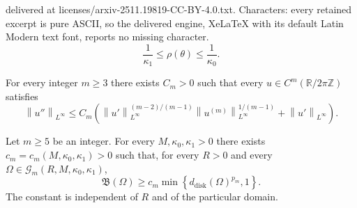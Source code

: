 \documentclass[10pt,a4paper]{amsart}
\newcommand{\R}{\mathbb{R}}
\newcommand{\cG}{\mathcal{G}}
\begin{document}
delivered at licenses/arxiv-2511.19819-CC-BY-4.0.txt. Characters: every retained excerpt is pure ASCII, so the delivered engine, XeLaTeX with its default Latin Modern text font, reports no missing character.
\begin{equation}\label{eq:rho-bounds}
\frac1{\kappa_1}\le\rho(\theta)\le\frac1{\kappa_0}.
\end{equation}

\begin{lemma}\label{lem:periodic-interpolation}
For every integer $m\geq3$ there exists $C_m>0$ such that every
$u\in C^m\left(\R/2\pi\mathbb Z\right)$ satisfies
\begin{equation}\label{eq:periodic-interpolation}
 \left\|u''\right\|_{L^\infty}
 \leq C_m\left(
 \left\|u'\right\|_{L^\infty}^{(m-2)/(m-1)}
 \left\|u^{(m)}\right\|_{L^\infty}^{1/(m-1)}
 +\left\|u'\right\|_{L^\infty}\right).
\end{equation}
\end{lemma}

\begin{proposition}
\label{prop:defect-distance}
Let $m\geq5$ be an integer. For every $M,\kappa_0,\kappa_1>0$ there exists
$c_m=c_m\left(M,\kappa_0,\kappa_1\right)>0$ such that, for every $R>0$ and every
$\Omega\in\cG_m\left(R,M,\kappa_0,\kappa_1\right)$,
\begin{equation}\label{eq:defect-distance-lower}
 \mathfrak B(\Omega)
 \geq c_m
 \min\left\{d_{\mathrm{disk}}(\Omega)^{p_m},1\right\}.
\end{equation}
The constant is independent of $R$ and of the particular domain.
\end{proposition}
\end{document}
